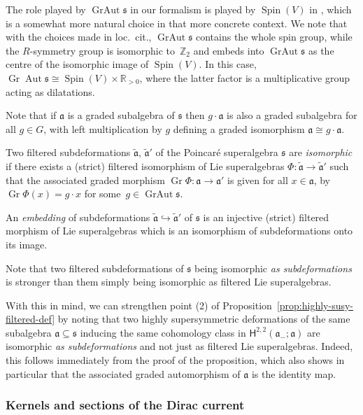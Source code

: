 \documentclass[10pt,a4paper]{amsart}
\numberwithin{equation}{section}
\newcommand{\fa}{\mathfrak{a}}
\newcommand{\fs}{\mathfrak{s}}
\newcommand{\RR}{\mathbb{R}}
\newcommand{\ZZ}{\mathbb{Z}}
\newcommand{\ssH}{\mathsf{H}}
\newcommand{\fatilde}{\widetilde{\fa}}
\newcommand{\1}{\mathbbm{1}}
\DeclareMathOperator{\Spin}{Spin}
\DeclareMathOperator{\Gr}{Gr}
\DeclareMathOperator{\Aut}{Aut}
\DeclareMathOperator{\GrAut}{GrAut}
\begin{document}
The role played by $\GrAut\fs$ in our formalism is played by $\Spin(V)$ in \cite{Figueroa-OFarrill2017_1}, which is a somewhat more natural choice in that more concrete context. We note that with the choices made in loc.\ cit., $\GrAut\fs$ contains the whole spin group, while the $R$-symmetry group is isomorphic to~$\ZZ_2$ and embeds into $\GrAut\fs$ as the centre of the isomorphic image of $\Spin(V)$. In this case, $\Gr\Aut\fs\cong\Spin(V)\times\RR_{>0}$, where the latter factor is a multiplicative group acting as dilatations.

Note that if $\fa$ is a graded subalgebra of $\fs$ then $g\cdot\fa$ is also a graded subalgebra for all $g\in G$, with left multiplication by $g$ defining a graded isomorphism $\fa\cong g\cdot\fa$.

\begin{Definition}\label{def:subdef-isom-embedding}
	Two filtered subdeformations $\fatilde$, $\fatilde'$ of the Poincar\'e superalgebra $\fs$ are \emph{isomorphic} if there exists a (strict) filtered isomorphism of Lie superalgebras $\Phi\colon \fatilde\to\fatilde'$ such that the associated graded morphism $\Gr\Phi\colon \fa\to\fa'$ is given for all $x\in \fa$, by $\Gr\Phi(x)=g\cdot x$ for some~${g\in\GrAut\fs}$.
	
	An \emph{embedding} of subdeformations $\fatilde\hookrightarrow\fatilde'$ of $\fs$ is an injective (strict) filtered morphism of Lie superalgebras which is an isomorphism of subdeformations onto its image.
\end{Definition}

Note that two filtered subdeformations of $\fs$ being isomorphic \emph{as subdeformations} is stronger than them simply being isomorphic as filtered Lie superalgebras.

With this in mind, we can strengthen point (2) of Proposition~\ref{prop:highly-susy-filtered-def} by noting that two highly supersymmetric deformations of the same subalgebra $\fa\subseteq\fs$ inducing the same cohomology class in $\ssH^{2,2}(\fa_-;\fa)$ are isomorphic \emph{as subdeformations} and not just as filtered Lie superalgebras. Indeed, this follows immediately from the proof of the proposition, which also shows in particular that the associated graded automorphism of $\fa$ is the identity map.

\subsubsection{Kernels and sections of the Dirac current}
\end{document}
